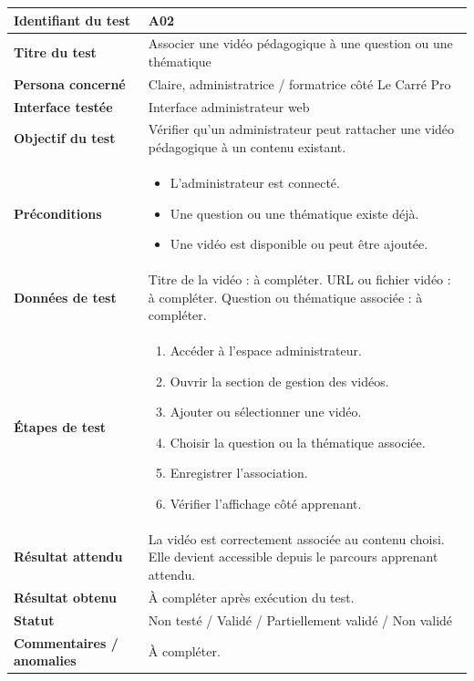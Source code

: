 \begin{longtable}{|p{4cm}|p{10cm}|}
\textbf{Identifiant du test} & A02 \\ \hline
\textbf{Titre du test} & Associer une vidéo pédagogique à une question ou une thématique \\ \hline
\textbf{Persona concerné} & Claire, administratrice / formatrice côté Le Carré Pro \\ \hline
\textbf{Interface testée} & Interface administrateur web \\ \hline
\textbf{Objectif du test} & Vérifier qu'un administrateur peut rattacher une vidéo pédagogique à un contenu existant. \\ \hline
\textbf{Préconditions} &
\begin{itemize}
    \item L'administrateur est connecté.
    \item Une question ou une thématique existe déjà.
    \item Une vidéo est disponible ou peut être ajoutée.
\end{itemize}
\\ \hline
\textbf{Données de test} & 
Titre de la vidéo : à compléter. \newline
URL ou fichier vidéo : à compléter. \newline
Question ou thématique associée : à compléter. \\ \hline
\textbf{Étapes de test} &
\begin{enumerate}
    \item Accéder à l'espace administrateur.
    \item Ouvrir la section de gestion des vidéos.
    \item Ajouter ou sélectionner une vidéo.
    \item Choisir la question ou la thématique associée.
    \item Enregistrer l'association.
    \item Vérifier l'affichage côté apprenant.
\end{enumerate}
\\ \hline
\textbf{Résultat attendu} & 
La vidéo est correctement associée au contenu choisi. Elle devient accessible depuis le parcours apprenant attendu. \\ \hline
\textbf{Résultat obtenu} & À compléter après exécution du test. \\ \hline
\textbf{Statut} & Non testé / Validé / Partiellement validé / Non validé \\ \hline
\textbf{Commentaires / anomalies} & À compléter. \\
\end{longtable}
\endgroup

